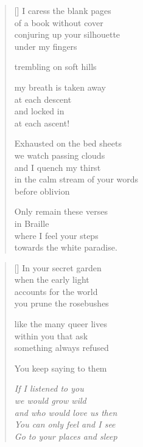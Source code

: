 \documentclass[14pt]{extbook}
\newcommand*{\centeredornament}{\centerline{\pgfornament[width=6cm]{88}}}
\begin{document}
\begin{verse}[\versewidth]
  I caress the blank pages \\
  of a book without cover \\
  conjuring up your silhouette \\
  under my fingers

  trembling on soft hills

  my breath is taken away \\
  at each descent \\
  and locked in \\
  at each ascent!

  Exhausted on the bed sheets \\
  we watch passing clouds \\
  and I quench my thirst \\
  in the calm stream of your words \\
  before oblivion

  Only remain these verses \\
  in Braille \\
  where I feel your steps \\
  towards the white paradise.
\end{verse}


\newpage

\vspace*{-15mm}
\centeredornament
\vspace*{-7mm}


\settowidth{\versewidth}{and who would love us then}

\begin{verse}[\versewidth]
  In your secret garden \\
  when the early light \\
  accounts for the world \\
  you prune the rosebushes

  like the many queer lives \\
  within you that ask \\
  something always refused

  You keep saying to them

  \emph{If I listened to you \\
  we would grow wild \\
  and who would love us then \\
  You can only feel and I see \\
  Go to your places and sleep}
\end{verse}
\end{document}
